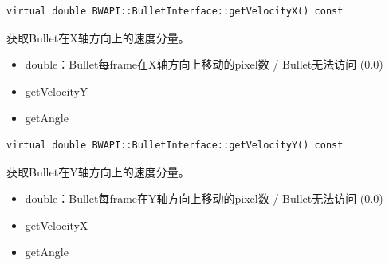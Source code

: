 \begin{tcolorbox}[colback=white, colframe=black!60!white, title=getVelocityX(), arc=0mm]
    \begin{verbatim}
virtual double BWAPI::BulletInterface::getVelocityX() const
    \end{verbatim}
    获取Bullet在X轴方向上的速度分量。
    \begin{return}
        \begin{itemize}
            \item double：Bullet每frame在X轴方向上移动的pixel数 / Bullet无法访问 (0.0)
        \end{itemize}
    \end{return}
    \begin{refer}
        \begin{itemize}
            \item getVelocityY
            \item getAngle
        \end{itemize}
    \end{refer}
\end{tcolorbox}

\begin{tcolorbox}[colback=white, colframe=black!60!white, title=getVelocityY(), arc=0mm]
    \begin{verbatim}
virtual double BWAPI::BulletInterface::getVelocityY() const
    \end{verbatim}
    获取Bullet在Y轴方向上的速度分量。
    \begin{return}
        \begin{itemize}
            \item double：Bullet每frame在Y轴方向上移动的pixel数 / Bullet无法访问 (0.0)
        \end{itemize}
    \end{return}
    \begin{refer}
        \begin{itemize}
            \item getVelocityX
            \item getAngle
        \end{itemize}
    \end{refer}
\end{tcolorbox}

